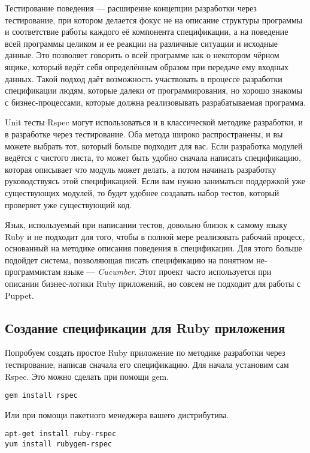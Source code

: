 Тестирование поведения --- расширение концепции разработки через тестирование, при котором делается фокус не на описание структуры программы и соответствие работы каждого её компонента спецификации, а на поведение всей программы целиком и ее реакции на различные ситуации и исходные данные. Это позволяет говорить о всей программе как о некотором чёрном ящике, который ведёт себя определённым образом при передаче ему входных данных. Такой подход даёт возможность участвовать в процессе разработки спецификации людям, которые далеки от программирования, но хорошо знакомы с бизнес-процессами, которые должна реализовывать разрабатываемая программа.

Unit тесты Rspec могут использоваться и в классической методике разработки, и в разработке через тестирование. Оба метода широко распространены, и вы можете выбрать тот, который больше подходит для вас. Если разработка модулей ведётся с чистого листа, то может быть удобно сначала написать спецификацию, которая описывает что модуль может делать, а потом начинать разработку руководствуясь этой спецификацией. Если вам нужно заниматься поддержкой уже существующих модулей, то будет удобнее создавать набор тестов, который проверяет уже существующий код.

Язык, используемый при написании тестов, довольно близок к самому языку Ruby и не подходит для того, чтобы в полной мере реализовать рабочий процесс, основанный на методике описания поведения в спецификации. Для этого больше подойдет система, позволяющая писать спецификацию на понятном не-программистам языке --- \emph{Cucumber}. Этот проект часто используется при описании бизнес-логики Ruby приложений, но совсем не подходит для работы с Puppet.

\subsection{Создание спецификации для Ruby приложения}

Попробуем создать простое Ruby приложение по методике разработки через тестирование, написав сначала его спецификацию. Для начала установим сам Rspec. Это можно сделать при помощи gem.

\begin{verbatim}
gem install rspec
\end{verbatim}

Или при помощи пакетного менеджера вашего дистрибутива.

\begin{verbatim}
apt-get install ruby-rspec
yum install rubygem-rspec
\end{verbatim}

